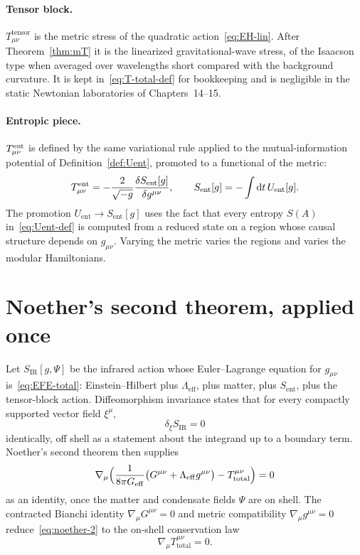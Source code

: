 \paragraph{Tensor block.}
\(T_{\mu\nu}^{\mathrm{tensor}}\) is the metric stress of the
quadratic action~\eqref{eq:EH-lin}. After Theorem~\ref{thm:mT} it
is the linearized gravitational-wave stress, of the Isaacson type
when averaged over wavelengths short compared with the background
curvature. It is kept in~\eqref{eq:T-total-def} for bookkeeping and
is negligible in the static Newtonian laboratories of
Chapters~14--15.

\paragraph{Entropic piece.}
\(T^{\mathrm{ent}}_{\mu\nu}\) is defined by the same variational rule applied
to the mutual-information potential of Definition~\ref{def:Uent},
promoted to a functional of the metric:
\begin{equation}
  \label{eq:Tent-var}
  T^{\mathrm{ent}}_{\mu\nu}
  =-\frac{2}{\sqrt{-g}}
    \frac{\delta S_{\mathrm{ent}}[g]}{\delta g^{\mu\nu}},
  \qquad
  S_{\mathrm{ent}}[g]
  =-\int\mathrm{d}t\,U_{\mathrm{ent}}[g].
\end{equation}
The promotion \(U_{\mathrm{ent}}\to S_{\mathrm{ent}}[g]\) uses the
fact that every entropy \(S(A)\) in~\eqref{eq:Uent-def} is computed
from a reduced state on a region whose causal structure depends on
\(g_{\mu\nu}\). Varying the metric varies the regions and varies
the modular Hamiltonians.

\section{Noether's second theorem, applied once}
\label{sec:ch11-noether}

Let \(S_{\mathrm{IR}}[g,\Psi]\) be the infrared action whose
Euler--Lagrange equation for \(g_{\mu\nu}\) is~\eqref{eq:EFE-total}:
Einstein--Hilbert plus \(\Lambda_{\mathrm{eff}}\), plus matter, plus
\(S_{\mathrm{ent}}\), plus the tensor-block action. Diffeomorphism
invariance states that for every compactly supported vector field
\(\xi^\mu\),
\begin{equation}
  \label{eq:diff-inv}
  \delta_\xi S_{\mathrm{IR}}=0
\end{equation}
identically, off shell as a statement about the integrand up to a
boundary term. Noether's second theorem then supplies
\begin{equation}
  \label{eq:noether-2}
  \nabla_\mu
  \Bigl(
    \frac{1}{8\pi G_{\mathrm{eff}}}
    \bigl(G^{\mu\nu}+\Lambda_{\mathrm{eff}}g^{\mu\nu}\bigr)
    -T^{\mu\nu}_{\mathrm{total}}
  \Bigr)
  =0
\end{equation}
as an identity, once the matter and condensate fields \(\Psi\) are
on shell. The contracted Bianchi identity
\(\nabla_\mu G^{\mu\nu}=0\) and metric compatibility
\(\nabla_\mu g^{\mu\nu}=0\) reduce~\eqref{eq:noether-2} to the
on-shell conservation law
\begin{equation}
  \label{eq:cons-law}
  \nabla_\mu T^{\mu\nu}_{\mathrm{total}}=0.
\end{equation}

